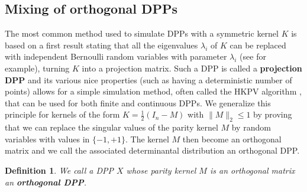 \documentclass{article}
\numberwithin{equation}{section}
\renewcommand{\leq}{\leqslant}
\theoremstyle{plain}
\newtheorem{definition}[proposition]{Definition}
\begin{document}
\subsection{Mixing of orthogonal DPPs}\label{sec: Mixing}
The most common method used to simulate DPPs with a symmetric kernel $K$ is based on a first result stating that all the eigenvalues $\lambda_i$ of $K$ can be replaced with independent Bernoulli random variables with parameter $\lambda_i$ (see \cite[Theorem 4.5.3]{Hough} for example), turning $K$ into a projection matrix. Such a DPP is called a \textbf{projection DPP} and its various nice properties (such as having a deterministic number of points) allows for a simple simulation method, often called the HKPV algorithm \cite[Algorithm 4.4.2]{Hough}, that can be used for both finite and continuous DPPs. We generalize this principle for kernels of the form $K=\frac{1}{2}(I_n - M)$ with $\|M\|_2\leq 1$ by proving that we can replace the singular values of the parity kernel $M$ by random variables with values in $\{-1, +1\}$. The kernel $M$ then become an orthogonal matrix and we call the associated determinantal distribution an orthogonal DPP.

\begin{definition}
We call a DPP $X$ whose parity kernel $M$ is an orthogonal matrix an \textbf{orthogonal DPP}.
\end{definition}
\end{document}
